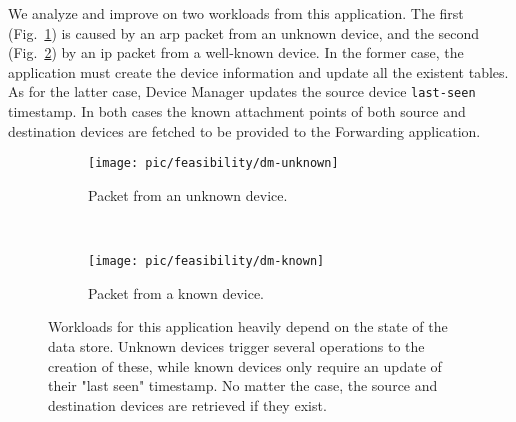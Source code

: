 We analyze and improve on two workloads from this application. 
The first (Fig.~\ref{fig:dm:interaction:unknown})  is caused by an \gls{arp} packet from an unknown device,  and the second (Fig.~\ref{fig:dm:interaction:known}) by an \gls{ip} packet from a well-known device. 
In the former case, the application must create the device information and update all the existent tables. As for the latter case, Device Manager updates the source device \texttt{last-seen} timestamp. 
In both cases the known attachment points of both source and destination devices  are fetched  to be provided  to the Forwarding application. 

\begin{figure}
  \centering
  \begin{subfigure}[b]{0.5\textwidth}
                \centering
                \texttt{[image: pic/feasibility/dm-unknown]}
                \caption{Packet from an unknown device.}
                \label{fig:dm:interaction:unknown}
        \end{subfigure}%
        ~
        \begin{subfigure}[b]{0.5\textwidth}
                \centering
                \texttt{[image: pic/feasibility/dm-known]}
                \caption{Packet from a known device.}
                \label{fig:dm:interaction:known}
        \end{subfigure}
        \caption[Device Manager workload events]{Workloads for this application heavily depend on the state of the data store. Unknown devices trigger several operations to the creation of these, while known devices only require an update of their "last seen" timestamp. No matter the case, the source and destination devices are retrieved if they exist.}
        \label{fig:dm:interaction}
\end{figure}


